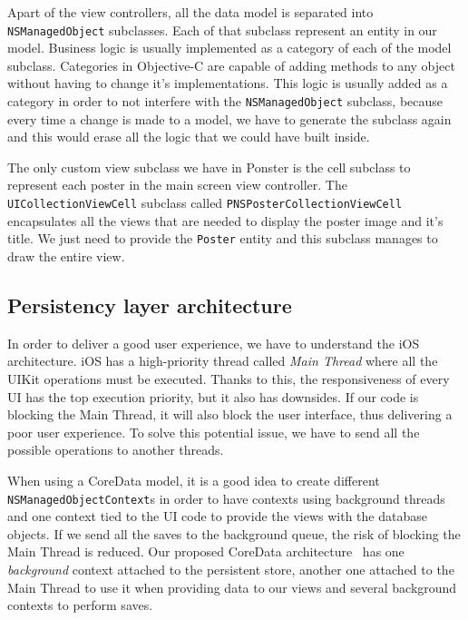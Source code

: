 Apart of the view controllers, all the data model is separated into
\texttt{NSManaged\-Object} subclasses. Each of that subclass represent an entity in
our model. Business logic is usually implemented as a category of each of the model
subclass. Categories in Objective-C are capable of adding methods to any object
without having to change it's implementations. This logic is usually added as a
category in order to not interfere with the \texttt{NSManagedObject} subclass,
because every time a change is made to a model, we have to generate the subclass
again and this would erase all the logic that we could have built inside.

The only custom view subclass we have in Ponster is the cell subclass to
represent each poster in the main screen view controller. The
\texttt{UI\-Collection\-View\-Cell} subclass called \texttt{PNSPoster\-Collection\-View\-Cell}
encapsulates all the views that are needed to display the poster image and it's
title. We just need to provide the \texttt{Poster} entity and this subclass manages
to draw the entire view.

\subsection{Persistency layer architecture}
\label{sec:persistency}
In order to deliver a good user experience, we have to understand the iOS
architecture. iOS has a high-priority thread called \emph{Main Thread} where all the
UIKit operations must be executed. Thanks to this, the responsiveness of every UI
has the top execution priority, but it also has downsides. If our code is blocking
the Main Thread, it will also block the user interface, thus delivering a poor user
experience. To solve this potential issue, we have to send all the possible
operations to another threads.

When using a CoreData model, it is a good idea to create different
\texttt{NSManaged\-Object\-Context}s in order to have contexts using background threads
and one context tied to the UI code to provide the views with the database
objects. If we send all the saves to the background queue, the risk of blocking the
Main Thread is reduced. Our proposed CoreData architecture~\cite{coredataarch} has
one \emph{background} context attached to the persistent store, another one attached
to the Main Thread to use it when providing data to our views and several background
contexts to perform saves.

